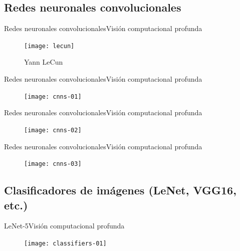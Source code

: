 \documentclass[10pt,border=3pt,tikz]{beamer}
\begin{document}
    \subsection{Redes neuronales convolucionales}
    \begin{frame}{Redes neuronales convolucionales}{Visión computacional profunda}
        \begin{figure}
            \centering
            \texttt{[image: lecun]}
            \caption{Yann LeCun}
        \end{figure}
    \end{frame}
    
    \begin{frame}{Redes neuronales convolucionales}{Visión computacional profunda}
        \begin{figure}
            \centering
            \texttt{[image: cnns-01]}
        \end{figure}
    \end{frame}
    
    \begin{frame}{Redes neuronales convolucionales}{Visión computacional profunda}
        \begin{figure}
            \centering
            \texttt{[image: cnns-02]}
        \end{figure}
    \end{frame}
    
    \begin{frame}{Redes neuronales convolucionales}{Visión computacional profunda}
        \begin{figure}
            \centering
            \texttt{[image: cnns-03]}
        \end{figure}
    \end{frame}
    
    \subsection{Clasificadores de imágenes (LeNet, VGG16, etc.)}
    \begin{frame}{LeNet-5}{Visión computacional profunda}
        \begin{figure}
            \centering
            \texttt{[image: classifiers-01]}
        \end{figure}
    \end{frame}
    
\end{document}
